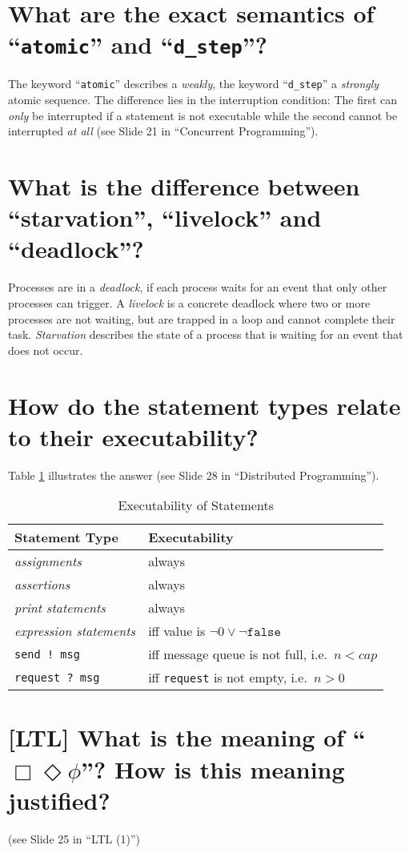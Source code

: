 \section{\capitals{[Promela]} What are the exact semantics of ``\texttt{atomic}'' and ``\texttt{d\_step}''?}
The keyword ``\texttt{atomic}'' describes a \emph{weakly}, the keyword ``\texttt{d\_step}'' a \emph{strongly} atomic sequence. The difference lies in the interruption condition: The first can \emph{only} be interrupted if a statement is not executable while the second cannot be interrupted \emph{at all} (see Slide 21 in ``Concurrent Programming'').

\section{What is the difference between ``starvation'', ``livelock'' and ``deadlock''?}
Processes are in a \emph{deadlock}, if each process waits for an event that only other processes can trigger. A \emph{livelock} is a concrete deadlock where two or more processes are not waiting, but are trapped in a loop and cannot complete their task. \emph{Starvation} describes the state of a process that is waiting for an event that does not occur.

\section{\capitals{[Promela]} How do the statement types relate to their executability?}
Table \ref{T:Exec} illustrates the answer (see Slide 28 in ``Distributed Programming'').
\begin{table}[h]
\centering
\caption{Executability of Statements}
\label{T:Exec}

\begin{tabular}{|l|l|}
\hline
\textbf{Statement Type} & \textbf{Executability} \\
\hline
\emph{assignments} & always \\
\emph{assertions} & always \\
\emph{print statements} & always \\
\emph{expression statements} & iff value is $\lnot 0 \lor \lnot \texttt{false}$ \\
\texttt{send !\ msg} & iff message queue is not full, i.e.\ $n < cap$ \\
\texttt{request ?\ msg} & iff \texttt{request} is not empty, i.e.\ $n > 0$\\
\hline
\end{tabular}
\end{table}

\section{[LTL] What is the meaning of ``$\Box\Diamond\phi$''? How is this meaning justified?}
(see Slide 25 in ``LTL (1)'')